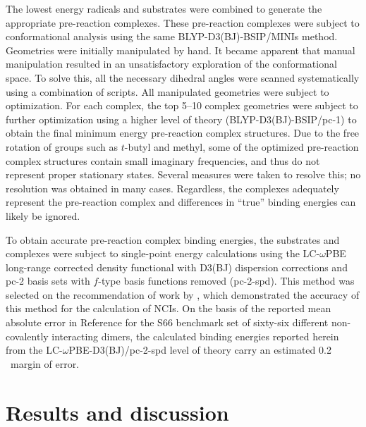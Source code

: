 \begin{doublespace}
The lowest energy radicals and substrates were combined to generate the
appropriate pre-reaction complexes. These pre-reaction complexes were subject to
conformational analysis using the same BLYP-D3(BJ)-BSIP/MINIs method. Geometries
were initially manipulated by hand. It became apparent that manual manipulation
resulted in an unsatisfactory exploration of the conformational space. To solve
this, all the necessary dihedral angles were scanned systematically using a
combination of scripts. All manipulated geometries
were subject to optimization. For each complex, the top 5--10 complex geometries
were subject to further optimization using a higher level of theory
(BLYP-D3(BJ)-BSIP/pc-1) to obtain the final minimum energy pre-reaction complex
structures. Due to the free rotation of groups such as $t$-butyl and methyl,
some of the optimized pre-reaction complex structures contain small imaginary
frequencies, and thus do not represent proper stationary states. Several
measures were taken to resolve this; no resolution was obtained in many
cases. Regardless, the complexes adequately represent the pre-reaction complex
and differences in ``true'' binding energies can likely be ignored.

To obtain accurate pre-reaction complex binding energies, the substrates and
complexes were subject to single-point energy calculations using the
LC-$\omega$PBE long-range corrected density functional\cite{Vydrov2006,
Vydrov2006a} with D3(BJ) dispersion corrections and pc-2 basis sets with
$f$-type basis functions removed (pc-2-spd).\cite{Johnson2013} This method was
selected on the recommendation of work by \citet{Johnson2013}, which
demonstrated the accuracy of this method for the calculation of NCIs. On the
basis of the reported mean absolute error in Reference  for
the S66 benchmark set of sixty-six different non-covalently interacting
dimers,\cite{Rezac2011} the calculated binding energies reported herein from the
LC-$\omega$PBE-D3(BJ)/pc-2-spd level of theory carry an estimated 0.2 \kcalmol\
margin of error.

\section{Results and discussion}


\end{doublespace}
